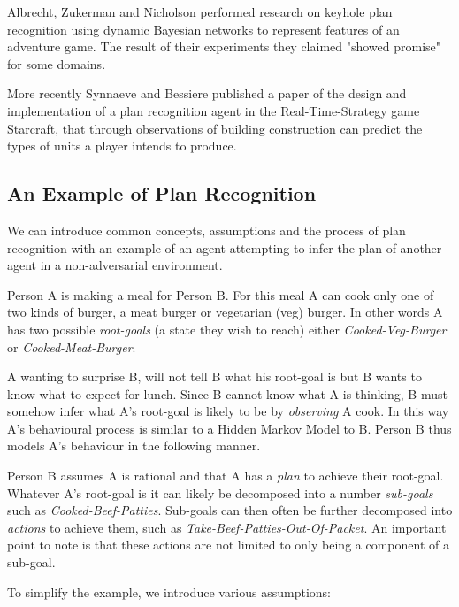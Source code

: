 \documentclass[parskip]{cs4rep}
\begin{document}
Albrecht, Zukerman and Nicholson \cite{Albrecht:1998:BMK:598277.598308} performed research on keyhole plan recognition using dynamic Bayesian networks to represent features of an adventure game. The result of their experiments they claimed "showed promise" for some domains. 

More recently Synnaeve and Bessiere \cite{conf/aiide/SynnaeveB11} published a paper of the design and implementation of a plan recognition agent in the Real-Time-Strategy game Starcraft, that through observations of building construction can predict the types of units a player intends to produce.

\subsection{An Example of Plan Recognition}

We can introduce common concepts, assumptions and the process of plan recognition with an example of an agent attempting to infer the plan of another agent in a non-adversarial environment. 

Person A is making a meal for Person B. For this meal A can cook only one of two kinds of burger, a meat burger or vegetarian (veg) burger. In other words A has two possible \textit{root-goals} (a state they wish to reach) either \textit{Cooked-Veg-Burger} or \textit{Cooked-Meat-Burger}. 

A wanting to surprise B, will not tell B what his root-goal is but B wants to know what to expect for lunch. Since B cannot know what A is thinking, B must somehow infer what A's root-goal is likely to be by \textit{observing} A cook. In this way A's behavioural process is similar to a Hidden Markov Model to B. Person B thus models A's behaviour in the following manner. 

Person B assumes A is rational and that A has a \textit{plan} to achieve their root-goal. Whatever A's root-goal is it can likely be decomposed into a number \textit{sub-goals} such as \textit{Cooked-Beef-Patties}. Sub-goals can then often be further decomposed into \textit{actions} to achieve them, such as \textit{Take-Beef-Patties-Out-Of-Packet}. An important point to note is that these actions are not limited to only being a component of a sub-goal.

To simplify the example, we introduce various assumptions:
\end{document}
